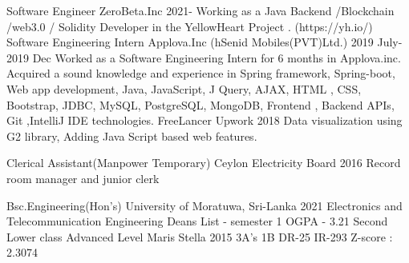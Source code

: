 \documentclass[11pt]{spidercv}
\begin{document}
    





    \begin{MainPart}

    \Experience
        {\ColorHighlight}
		{Software Engineer}
		{ZeroBeta.Inc}
        {2021-\faUndo}
        {   
           Working as a Java Backend /Blockchain /web3.0 / Solidity Developer in the YellowHeart Project . (https://yh.io/)
        }
    \Experience
        {\ColorHighlight}
		{Software Engineering Intern}
		{Applova.Inc (hSenid Mobiles(PVT)Ltd.)}
        {2019 July- 2019 Dec}
        {   
            Worked as a Software Engineering Intern for 6 months in Applova.inc. \newline
            Acquired a sound knowledge and experience in Spring framework, Spring-boot, Web app development, Java, JavaScript, J Query, AJAX, HTML , CSS, Bootstrap, JDBC, MySQL, PostgreSQL, MongoDB, Frontend , Backend APIs, Git ,IntelliJ IDE technologies.
        }
    \Experience
        {\ColorHighlight}
		{FreeLancer}
		{Upwork}
        {2018}
        {   
          Data visualization using G2 library, Adding Java Script based web features.
        }
        
     \Experience
        {\ColorHighlight}
		{Clerical Assistant(Manpower Temporary)}
		{Ceylon Electricity Board}
        {2016}
        {   
          Record room manager and junior clerk 
        }


    
    \Experience
        {\ColorHighlight}
		{Bsc.Engineering(Hon's)}
		{University of Moratuwa, Sri-Lanka}
        {2021}
        {   
            Electronics and Telecommunication Engineering \newline
            Deans List - semester 1 \newline
            OGPA - 3.21  \newline
            Second Lower class
        }
    \Experience
        {\ColorHighlight}
		{Advanced Level}
		{Maris Stella}
        {2015}
        {   
            3A's 1B DR-25 IR-293  \newline
            Z-score : 2.3074
        }



\end{MainPart}
\end{document}
